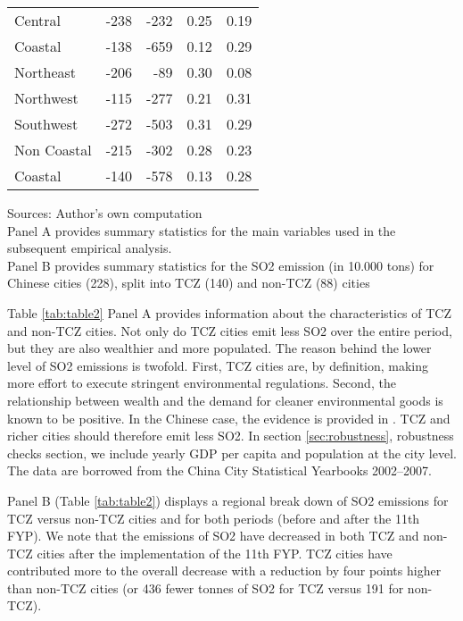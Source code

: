 \documentclass[12pt]{article}
\begin{document}
\begin{table}[!htbp]
\begin{adjustbox}{width=\textwidth, totalheight=\baselineskip,keepaspectratio}
\begin{tabular}{lrrrr}
      Central     &    -238 & -232 &     0.25 & 0.19 \\
      Coastal     &    -138 & -659 &     0.12 & 0.29 \\
      Northeast   &    -206 &  -89 &     0.30 & 0.08 \\
      Northwest   &    -115 & -277 &     0.21 & 0.31 \\
      Southwest   &    -272 & -503 &     0.31 & 0.29 \\
      Non Coastal &    -215 & -302 &     0.28 & 0.23 \\
      Coastal     &    -140 & -578 &     0.13 & 0.28 \\
      \bottomrule
      \hline
    \end{tabular}
    \end{adjustbox}
    \begin{tablenotes}
      \small
      \item 
      Sources: Author's own computation \\
      Panel A provides summary statistics for the main variables used in the subsequent empirical analysis. \\
  Panel B provides summary statistics for the SO2 emission (in 10.000 tons) for Chinese cities (228), split into TCZ (140) and non-TCZ (88) cities
      \\
    \end{tablenotes}
\end{table}

Table \ref{tab:table2} Panel A provides information about the characteristics of TCZ and non-TCZ cities. Not only do TCZ cities emit less SO2 over the entire period, but they are also wealthier and more populated. The reason behind the lower level of SO2 emissions is twofold. First, TCZ cities are, by definition, making more effort to execute stringent environmental regulations. Second, the relationship between wealth and the demand for cleaner environmental goods is known to be positive. In the Chinese case, the evidence is provided in \cite{Hering2014-af}. TCZ and richer cities should therefore emit less SO2. In section \ref{sec:robustness}, robustness checks section, we include yearly GDP per capita and population at the city level. The data are borrowed from the China City Statistical Yearbooks 2002–2007.

Panel B (Table \ref{tab:table2}) displays a regional break down of SO2 emissions for TCZ versus non-TCZ cities and for both periods (before and after the 11th FYP). We note that the emissions of SO2 have decreased in both TCZ and non-TCZ cities after the implementation of the 11th FYP. TCZ cities have contributed more to the overall decrease with a reduction by four points higher than non-TCZ cities (or 436 fewer tonnes of SO2 for TCZ versus 191 for non-TCZ). 
\end{document}
